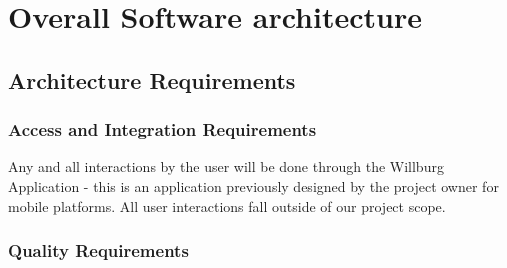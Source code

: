 \documentclass[a4paper,12pt]{report}
\begin{document}
\section {Overall Software architecture}	
\subsection{Architecture Requirements}
\subsubsection{Access and Integration Requirements}
Any and all interactions by the user will be done through the Willburg Application - this is an application previously designed by the project owner for mobile platforms. All user interactions fall outside of our project scope. 
\subsubsection{Quality Requirements}
\end{document}
